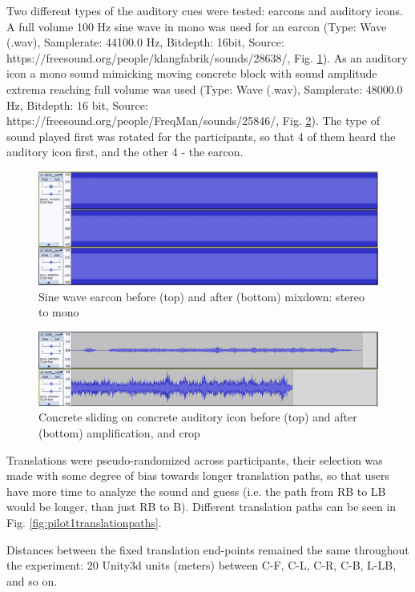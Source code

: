 Two different types of the auditory cues were tested: earcons and auditory icons. A full volume 100 Hz sine wave in mono was used for an earcon (Type: Wave (.wav), Samplerate: 44100.0 Hz, Bitdepth: 16bit, Source: https://freesound.org/people/klangfabrik/sounds/28638/, Fig. \ref{fig:pilot1sinewaveedit}). As an auditory icon a mono sound mimicking moving concrete block with sound amplitude extrema reaching full volume was used (Type: Wave (.wav), Samplerate: 48000.0 Hz, Bitdepth: 16 bit, Source: https://freesound.org/people/FreqMan/sounds/25846/, Fig. \ref{fig:pilot1concreteonconcretesoundedit}).
The type of sound played first was rotated for the participants, so that 4 of them heard the auditory icon first, and the other 4 - the earcon.

\begin{figure}
	\centering
	\includegraphics[width=0.7\linewidth]{figures/pilot1_sinewave_edit}
	\caption{Sine wave earcon before (top) and after (bottom) mixdown: stereo to mono}
	\label{fig:pilot1sinewaveedit}
\end{figure}

\begin{figure}
	\centering
	\includegraphics[width=0.7\linewidth]{figures/pilot1_concrete_on_concrete_sound_edit}
	\caption{Concrete sliding on concrete auditory icon before (top) and after (bottom) amplification, and crop}
	\label{fig:pilot1concreteonconcretesoundedit}
\end{figure}

Translations were pseudo-randomized across participants, their selection was made with some degree of bias towards longer translation paths, so that users have more time to analyze the sound and guess (i.e. the path from RB to LB would be longer, than just RB to B). Different translation paths can be seen in Fig. \ref{fig:pilot1translationpaths}.

Distances between the fixed translation end-points remained the same throughout the experiment: 20 Unity3d units (meters) between C-F, C-L, C-R, C-B, L-LB, and so on.


